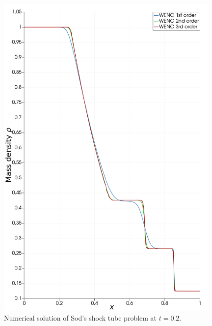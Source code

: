\begin{figure}[p]
\centering
\includegraphics[width=0.98\textwidth]{sod1.png}
\caption{Numerical solution of Sod's shock tube problem at $t = 0.2$.}
\label{fig:sod}
\end{figure}

